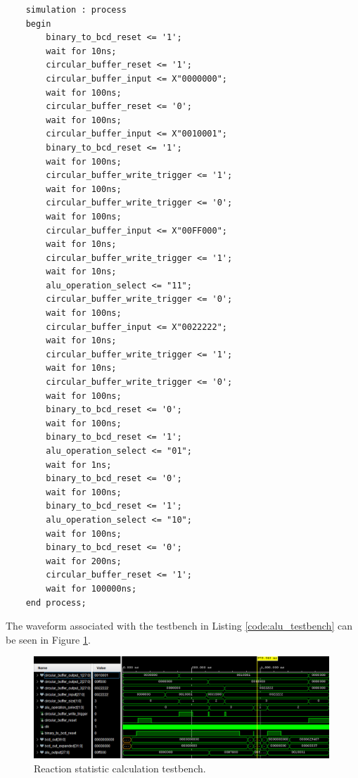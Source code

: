 \documentclass[11pt]{article}
\newenvironment{code}{\captionsetup{type=listing}}{}
\begin{document}
\begin{code}
\begin{verbatim}
    simulation : process
    begin
        binary_to_bcd_reset <= '1';
        wait for 10ns;
        circular_buffer_reset <= '1';
        circular_buffer_input <= X"0000000";
        wait for 100ns;
        circular_buffer_reset <= '0';
        wait for 100ns;
        circular_buffer_input <= X"0010001";
        binary_to_bcd_reset <= '1';
        wait for 100ns;
        circular_buffer_write_trigger <= '1';
        wait for 100ns;
        circular_buffer_write_trigger <= '0';
        wait for 100ns;
        circular_buffer_input <= X"00FF000";
        wait for 10ns;
        circular_buffer_write_trigger <= '1';
        wait for 10ns;
        alu_operation_select <= "11";
        circular_buffer_write_trigger <= '0';
        wait for 100ns;
        circular_buffer_input <= X"0022222";
        wait for 10ns;
        circular_buffer_write_trigger <= '1';
        wait for 10ns;
        circular_buffer_write_trigger <= '0';
        wait for 100ns;
        binary_to_bcd_reset <= '0';
        wait for 100ns;
        binary_to_bcd_reset <= '1';
        alu_operation_select <= "01";
        wait for 1ns;
        binary_to_bcd_reset <= '0';
        wait for 100ns;
        binary_to_bcd_reset <= '1';
        alu_operation_select <= "10";
        wait for 100ns;
        binary_to_bcd_reset <= '0';
        wait for 200ns;
        circular_buffer_reset <= '1';
        wait for 100000ns;
    end process;

  \end{verbatim}
  \captionsetup{belowskip=0pt}
  \label{code:alu_testbench}
\end{code}

\vspace*{1cm}

The waveform associated with the testbench in Listing \ref{code:alu_testbench} can be seen in Figure \ref{fig:alu_testbench_2}.

\begin{figure}[H]

  \centering

  \includegraphics[width=0.99\textwidth]{WhatsApp Image 2025-05-07 at 11.33.07.jpeg}

  \caption{Reaction statistic calculation testbench.}

  \label{fig:alu_testbench_2}
\end{figure}
\end{document}
